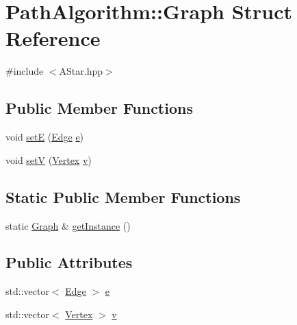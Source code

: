 \hypertarget{struct_path_algorithm_1_1_graph}{}\section{Path\+Algorithm\+:\+:Graph Struct Reference}
\label{struct_path_algorithm_1_1_graph}


{\ttfamily \#include $<$A\+Star.\+hpp$>$}

\subsection*{Public Member Functions}
\begin{DoxyCompactItemize}
\item 
void \hyperlink{struct_path_algorithm_1_1_graph_a185d5e83f65e20c5549169a1f8c2c6e6}{setE} (\hyperlink{struct_path_algorithm_1_1_edge}{Edge} \hyperlink{struct_path_algorithm_1_1_graph_a74823a65650b0f20268b0a274a2b69a7}{e})
\item 
void \hyperlink{struct_path_algorithm_1_1_graph_a7754a1020f2d394070f7cdf63ba1e446}{setV} (\hyperlink{struct_path_algorithm_1_1_vertex}{Vertex} \hyperlink{struct_path_algorithm_1_1_graph_a8c71f9d9965684ae31ab85ccec9c8114}{v})
\end{DoxyCompactItemize}
\subsection*{Static Public Member Functions}
\begin{DoxyCompactItemize}
\item 
static \hyperlink{struct_path_algorithm_1_1_graph}{Graph} \& \hyperlink{struct_path_algorithm_1_1_graph_ab9015f34eac8789354a91091630fbbe9}{get\+Instance} ()
\end{DoxyCompactItemize}
\subsection*{Public Attributes}
\begin{DoxyCompactItemize}
\item 
std\+::vector$<$ \hyperlink{struct_path_algorithm_1_1_edge}{Edge} $>$ \hyperlink{struct_path_algorithm_1_1_graph_a74823a65650b0f20268b0a274a2b69a7}{e}
\item 
std\+::vector$<$ \hyperlink{struct_path_algorithm_1_1_vertex}{Vertex} $>$ \hyperlink{struct_path_algorithm_1_1_graph_a8c71f9d9965684ae31ab85ccec9c8114}{v}
\end{DoxyCompactItemize}


